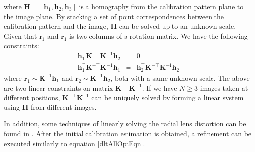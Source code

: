 \documentclass{report}
\begin{document}
where $\mathbf{H} = [\mathbf{h}_1, \mathbf{h}_2, \mathbf{h}_3]$ is a homography from the calibration pattern plane to the image plane. By stacking a set of point correspondences between the calibration pattern and the image, $\mathbf{H}$ can be solved up to an unknown scale. Given that $\mathbf{r}_1$ and $\mathbf{r}_1$ is two columns of a rotation matrix. We have the following constraints: 
\begin{eqnarray}
\mathbf{h}_1^\top \mathbf{K}^{-\top} \mathbf{K}^{-1} \mathbf{h}_2 &=& 0 \\
\mathbf{h}_1^\top \mathbf{K}^{-\top} \mathbf{K}^{-1} \mathbf{h}_1 &=& \mathbf{h}_2^\top \mathbf{K}^{-\top} \mathbf{K}^{-1} \mathbf{h}_2
\end{eqnarray}
where $\mathbf{r}_1 \sim \mathbf{K}^{-1} \mathbf{h}_1$ and $\mathbf{r}_2 \sim \mathbf{K}^{-1} \mathbf{h}_2$, both with a same unknown scale. The above are two linear constraints on matrix $\mathbf{K}^{-\top} \mathbf{K}^{-1}$. If we have $N \geq 3$ images taken at different positions, $\mathbf{K}^{-\top} \mathbf{K}^{-1}$ can be uniquely solved by forming a linear system using $\mathbf{H}$ from different images. 

In addition, some techniques of linearly solving the radial lens distortion can be found in \cite{zhang2000flexible}. After the initial calibration estimation is obtained, a refinement can be executed similarly to equation \ref{dltAllOptEqn}. 
\end{document}
